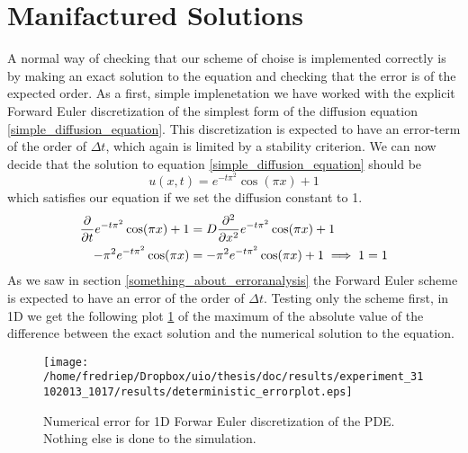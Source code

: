 \section{Manifactured Solutions}
A normal way of checking that our scheme of choise is implemented correctly is by making an exact solution to the equation and checking that the error is of the expected order. 
As a first, simple implenetation we have worked with the explicit Forward Euler discretization of the simplest form of the diffusion equation \ref*{simple_diffusion_equation}. 
This discretization is expected to have an error-term of the order of $\Delta t$, which again is limited by a stability criterion. 
We can now decide that the solution to equation \ref{simple_diffusion_equation} should be
\begin{equation}\label{manifactured_solution_1D}
 u(x,t) = e^{-t\pi^2}\cos(\pi x) +1
\end{equation}
which satisfies our equation if we set the diffusion constant to 1.
\begin{align}
 \frac{\partial }{\partial t}e^{-t\pi^2}\cos(\pi x) +1 &= D\frac{\partial^2}{\partial x^2}e^{-t\pi^2}\cos(\pi x) +1\\
 -\pi^2e^{-t\pi^2}\cos(\pi x) &= -\pi^2e^{-t\pi^2}\cos(\pi x) +1 \implies 1 = 1
\end{align}
As we saw in section \ref{something_about_erroranalysis} the Forward Euler scheme is expected to have an error of the order of $\Delta t$. 
Testing only the scheme first, in 1D we get the following plot \ref{errorplot_FE1D_noWalk} of the maximum of the absolute value of the difference between the exact solution and the numerical solution to the equation. 

\begin{figure}[H]
\centering
\texttt{[image: /home/fredriep/Dropbox/uio/thesis/doc/results/experiment\_31102013\_1017/results/deterministic\_errorplot.eps]}
\caption[Numerical error for 1D Forwar Euler discretization]{Numerical error for 1D Forwar Euler discretization of the PDE. Nothing else is done to the simulation.}
\label{errorplot_FE1D_noWalk}
\end{figure}

